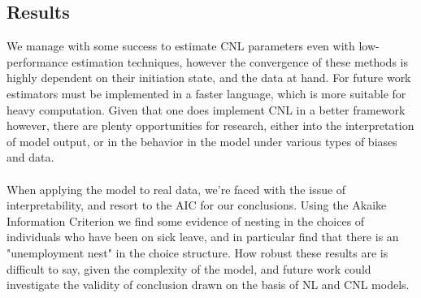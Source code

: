 


\subsection{Results}
We manage with some success to estimate CNL parameters even with low-performance estimation techniques, however the convergence of these methods is highly dependent on their initiation state, and the data at hand. For future work estimators must be implemented in a faster language, which is more suitable for heavy computation. Given that one does implement CNL in a better framework however, there are plenty opportunities for research, either into the interpretation of model output, or in the behavior in the model under various types of biases and data.
\\ \\
When applying the model to real data, we're faced with the issue of interpretability, and resort to the AIC for our conclusions. Using the Akaike Information Criterion we find some evidence of nesting in the choices of individuals who have been on sick leave, and in particular find that there is an "unemployment nest" in the choice structure. How robust these results are is difficult to say, given the complexity of the model, and future work could investigate the validity of conclusion drawn on the basis of NL and CNL models.

